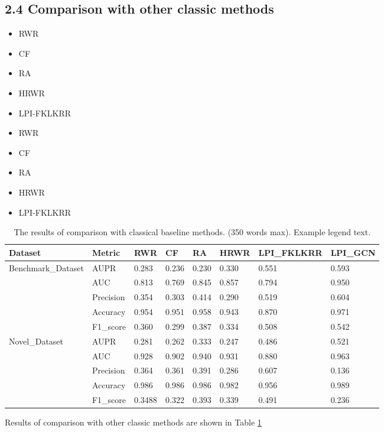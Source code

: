 \documentclass[fleqn,10pt]{wlscirep}
\begin{document}
\subsection*{2.4 Comparison with other classic methods}
\begin{itemize}
\item RWR
\item CF
\item RA
\item HRWR
\item LPI-FKLKRR
\end{itemize}
\begin{itemize}
\item RWR
\item CF
\item RA
\item HRWR
\item LPI-FKLKRR
\end{itemize}

\begin{table}[ht]
\centering
\caption{\label{tab:Comparison1}The results of comparison with classical baseline methods. (350 words max). Example legend text.}
\begin{tabular}{|l|l|l|l|l|l|l|l|}
\hline
Dataset	& Metric & RWR	& CF & RA & HRWR & LPI_FKLKRR & LPI_GCN \\
\hline
\multirow{5}{9em}{Benchmark_Dataset} 
& AUPR & 0.283 & 0.236 & 0.230 & 0.330 & 0.551 & 0.593 \\ 
& AUC & 0.813 & 0.769 	& 0.845 & 0.857 & 0.794 & 0.950 \\
& Precision	& 0.354  & 0.303 & 0.414 & 0.290 & 0.519 & 0.604 \\
& Accuracy	& 0.954 & 0.951 & 0.958 & 0.943 & 0.870 & 0.971 \\
& F1_score & 0.360 & 0.299 & 0.387 & 0.334 & 0.508 & 0.542 \\
\hline
\multirow{5}{9em}{Novel_Dataset} 
&AUPR	&0.281	&0.262	&0.333	&0.247	&0.486	&0.521\\
&AUC	&0.928	&0.902	&0.940	&0.931	&0.880	&0.963\\
&Precision	&0.364	&0.361	&0.391	&0.286	&0.607	&0.136\\
&Accuracy	&0.986	&0.986	&0.986	&0.982	&0.956	&0.989\\
&F1_score	&0.3488	&0.322	&0.393	&0.339	&0.491	&0.236\\
\hline
\end{tabular}
\end{table}
Results of comparison with other classic methods are shown in Table \ref{tab:Comparison1}
\end{document}
